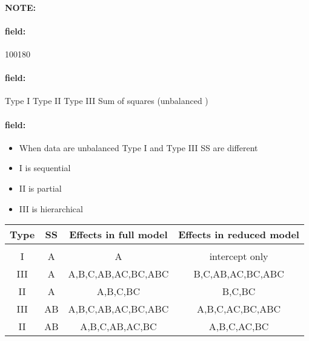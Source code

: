 \documentclass[12pt]{article}
\newenvironment{note}{\paragraph{NOTE:}}{}
\newenvironment{field}{\paragraph{field:}}{}
\begin{document}
\begin{note}
    \begin{field}
        \tiny 100180
    \end{field}
    \begin{field}
        Type I Type II Type III Sum of squares (unbalanced )
    \end{field}
    \begin{field}
        \begin{itemize}
          \item When data are unbalanced Type I and Type III SS are different
          \item I is sequential
          \item II is partial
          \item III is hierarchical
        \end{itemize}

\begin{center}
  \begin{tabular}{|c|c|c|c|}
    Type & SS & Effects in full model & Effects in reduced model \\
    \hline \\
    I & A & A & intercept only \\
    III & A & A,B,C,AB,AC,BC,ABC & B,C,AB,AC,BC,ABC \\
    II & A& A,B,C,BC & B,C,BC \\
    III & AB & A,B,C,AB,AC,BC,ABC & A,B,C,AC,BC,ABC \\
    II & AB & A,B,C,AB,AC,BC & A,B,C,AC,BC

  \end{tabular}
\end{center}


    \end{field}
\end{note}


\end{document}
